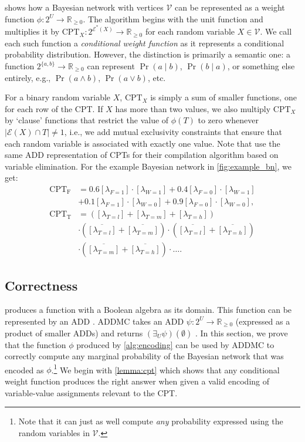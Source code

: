 \documentclass[accepted]{uai2021}
\theoremstyle{definition}
\begin{document}
 shows how a Bayesian network with vertices $\mathcal{V}$
can be represented as a weight function $\phi\colon 2^U \to \mathbb{R}_{\ge 0}$.
The algorithm begins with the unit function and multiplies it by
$\mathrm{CPT}_X\colon 2^{\mathcal{E}^*(X)} \to \mathbb{R}_{\ge 0}$ for each
random variable $X \in \mathcal{V}$. We call each such function a
\emph{conditional weight function} as it represents a conditional probability
distribution. However, the distinction is primarily a semantic one: a function
$2^{\{a, b\}} \to \mathbb{R}_{\ge 0}$ can represent $\Pr(a \mid b)$, $\Pr(b \mid
a)$, or something else entirely, e.g., $\Pr(a \land b)$, $\Pr(a \lor b)$, etc.

For a binary random variable $X$, $\mathrm{CPT}_X$ is simply a sum of smaller
functions, one for each row of the CPT. If $X$ has more than two values, we also
multiply $\mathrm{CPT}_X$ by `clause' functions that restrict the value of
$\phi(T)$ to zero whenever $|\mathcal{E}(X) \cap T| \ne 1$, i.e., we add mutual
exclusivity constraints that ensure that each random variable is associated with
exactly one value. Note that \citet{DBLP:conf/ijcai/ChaviraD07} use the same ADD
representation of CPTs for their compilation algorithm based on variable
elimination. For the example Bayesian network in \cref{fig:example_bn}, we get:
\begin{align*}
  \mathrm{CPT_F} &= 0.6[\lambda_{F=1}] \cdot [\lambda_{W=1}] + 0.4[\lambda_{F=0}] \cdot [\lambda_{W=1}] \\
                 &+ 0.1[\lambda_{F=1}] \cdot [\lambda_{W=0}] + 0.9[\lambda_{F=0}] \cdot [\lambda_{W=0}], \\
  \mathrm{CPT_T} &= ([\lambda_{T=l}] + [\lambda_{T=m}] + [\lambda_{T=h}]) \\
                 &\cdot (\overline{[\lambda_{T=l}]} + \overline{[\lambda_{T=m}]}) \cdot (\overline{[\lambda_{T=l}]} + \overline{[\lambda_{T=h}]}) \\
                 &\cdot (\overline{[\lambda_{T=m}]} + \overline{[\lambda_{T=h}]}) \cdot \dots.
\end{align*}

\subsection{Correctness}

 produces a function with a Boolean algebra as its domain.
This function can be represented by an ADD
\citep{DBLP:journals/fmsd/BaharFGHMPS97}. \textsf{ADDMC} takes an ADD
$\psi\colon 2^{U} \to \mathbb{R}_{\ge 0}$ (expressed as a product of smaller
ADDs) and returns $(\exists_U\psi)(\emptyset)$ \citep{DBLP:conf/aaai/DudekPV20}.
In this section, we prove that the function $\phi$ produced by
\cref{alg:encoding} can be used by \textsf{ADDMC} to correctly compute any
marginal probability of the Bayesian network that was encoded as
$\phi$.\footnote{Note that it can just as well compute \emph{any} probability
  expressed using the random variables in $\mathcal{V}$.} We begin with
\cref{lemma:cpt} which shows that any conditional weight function produces the
right answer when given a valid encoding of variable-value assignments relevant
to the CPT.
\end{document}
